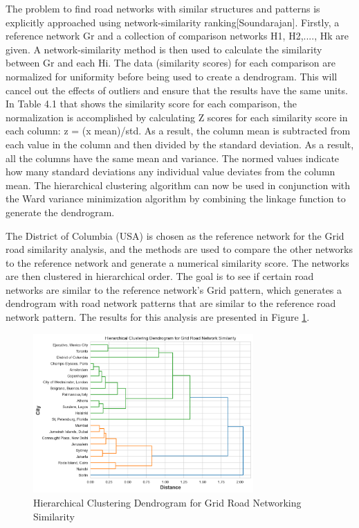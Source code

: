 The problem to find road networks with similar structures and patterns is explicitly approached using network-similarity ranking[Soundarajan]. Firstly, a reference network Gr and a collection of comparison networks H1, H2,...., Hk are given. A network-similarity method is then used to calculate the similarity between Gr and each Hi. The data (similarity scores) for each comparison are normalized for uniformity before being used to create a dendrogram. This will cancel out the effects of outliers and ensure that the results have the same units. In Table 4.1 that shows the similarity score for each comparison, the normalization is accomplished by calculating Z scores for each similarity score in each column: z = (x mean)/std. As a result, the column mean is subtracted from each value in the column and then divided by the standard deviation. As a result, all the columns have the same mean and variance. The normed values indicate how many standard deviations any individual value deviates from the column mean. The hierarchical clustering algorithm can now be used in conjunction with the Ward variance minimization algorithm by combining the linkage function to generate the dendrogram. 

The District of Columbia (USA) is chosen as the reference network for the Grid road similarity analysis, and the methods are used to compare the other networks to the reference network and generate a numerical similarity score. The networks are then clustered in hierarchical order. The goal is to see if certain road networks are similar to the reference network's Grid pattern, which generates a dendrogram with road network patterns that are similar to the reference road network pattern. The results for this analysis are presented in Figure \ref{fig:Hierarchical Clustering Dendrogram for Grid Road Networking Similarity}.

\begin{figure}[!ht]
\centering
\includegraphics[width=0.75\textwidth,center]{picture/Grid/grid_dendrogram2.png}
\caption[Hierarchical Clustering Dendrogram for Grid Road Networking Similarity]{Hierarchical Clustering Dendrogram for Grid Road Networking Similarity}
\label{fig:Hierarchical Clustering Dendrogram for Grid Road Networking Similarity}
\end{figure}

